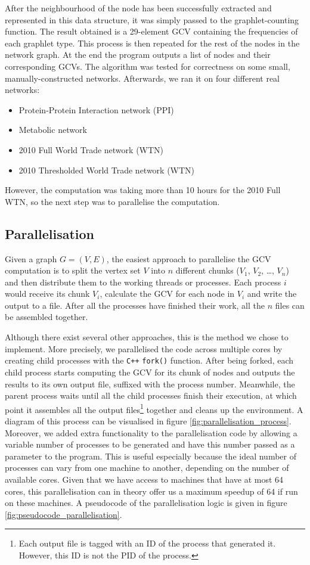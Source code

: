 After the neighbourhood of the node has been successfully extracted and represented in this data structure, it was simply passed to the graphlet-counting function. The result obtained is a 29-element GCV containing the frequencies of each graphlet type. This process is then repeated for the rest of the nodes in the network graph. At the end the program outputs a list of nodes and their corresponding GCVs. The algorithm was tested for correctness on some small, manually-constructed networks. Afterwards, we ran it on four different real networks:
\begin{itemize}
 \item Protein-Protein Interaction network (PPI)
 \item Metabolic network
 \item 2010 Full World Trade network (WTN)
 \item 2010 Thresholded World Trade network (WTN) 
\end{itemize}

However, the computation was taking more than 10 hours for the 2010 Full WTN, so the next step was to parallelise the computation.

\subsection{Parallelisation}

Given a graph $G = (V,E)$, the easiest approach to parallelise the GCV computation is to split the vertex set $V$ into $n$ different chunks ($V_1$, $V_2$, \dots , $V_n$) and then distribute them to the working threads or processes. Each process $i$ would receive its chunk $V_i$, calculate the GCV for each node in $V_i$ and write the output to a file. After all the processes have finished their work, all the $n$ files can be assembled together. 

Although there exist several other approaches, this is the method we chose to implement. More precisely, we parallelised the code across multiple cores by creating child processes with the \verb!C++! \lstinline|fork()| function. After being forked, each child process starts computing the GCV for its chunk of nodes and outputs the results to its own output file, suffixed with the process number. Meanwhile, the parent process waits until all the child processes finish their execution, at which point it assembles all the output files\footnote{Each output file is tagged with an ID of the process that generated it. However, this ID is not the PID of the process.} together and cleans up the environment. A diagram of this process can be visualised in figure \ref{fig:parallelisation_process}. Moreover, we added extra functionality to the parallelisation code by allowing a variable number of processes to be generated and have this number passed as a parameter to the program. This is useful especially because the 
ideal number of processes can vary from one machine to another, depending on the number of available cores. Given that we have access to machines that have at most 64 cores, this parallelisation can in theory offer us a maximum speedup of 64 if run on these machines. A pseudocode of the parallelisation logic is given in figure \ref{fig:pseudocode_parallelisation}.

